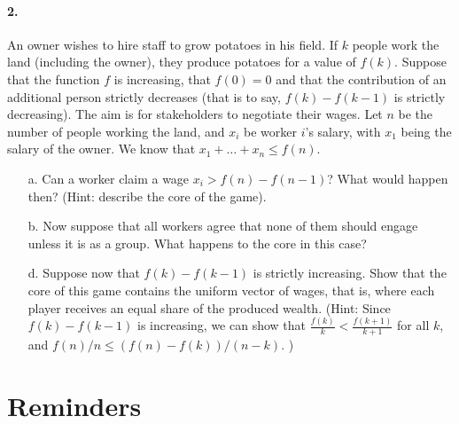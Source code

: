 \documentclass{../ape}
\begin{document}
\begin{solution}

\end{solution}

\paragraph{2. } An owner wishes to hire staff to grow potatoes in his field. If $k$ people work the land (including the owner), they produce potatoes for a value of $f(k)$. Suppose that the function $f$ is increasing, that $f(0) = 0$ and that the contribution of an additional person strictly decreases (that is to say, $f(k) - f(k-1)$ is strictly decreasing). The aim is for stakeholders to negotiate their wages. Let $n$ be the number of people working the land, and $x_i$ be worker $i$'s salary, with $x_1$ being the salary of the owner. We know that $x_1 + \dots + x_n \leq f(n)$.
\begin{enumerate}
	\item[a.] Can a worker claim a wage $x_i > f(n) - f(n-1)$? What would happen then? (Hint: describe the core of the game).
	\item[b.] Now suppose that all workers agree that none of them should engage unless it is as a group. What happens to the core in this case?
	\item[d.] Suppose now that $f(k) - f(k-1)$ is strictly increasing. Show that the core of this game contains the uniform vector of wages, that is, where each player receives an equal share of the produced wealth. (Hint: Since $f(k) - f(k-1)$ is increasing, we can show that  $\frac{f(k)}{k} < \frac{f(k + 1)}{k + 1} $ for all $k$, and $f(n)/n \leq (f(n) - f(k))/(n-k)$. )
\end{enumerate}
	


\section*{Reminders}
\end{document}

